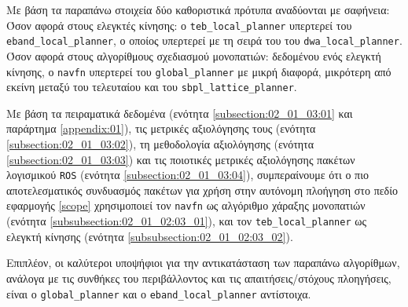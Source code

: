 Με βάση τα παραπάνω στοιχεία δύο καθοριστικά πρότυπα αναδύονται με σαφήνεια:
Όσον αφορά στους ελεγκτές κίνησης: ο \texttt{teb\_local\_planner} υπερτερεί του
\texttt{eband\_local\_planner}, ο οποίος υπερτερεί με τη σειρά του του
\texttt{dwa\_local\_planner}. Όσον αφορά στους αλγορίθμους σχεδιασμού
μονοπατιών: δεδομένου ενός ελεγκτή κίνησης, ο \texttt{navfn} υπερτερεί του
\texttt{global\_planner} με μικρή διαφορά, μικρότερη από εκείνη μεταξύ του
τελευταίου και του \texttt{sbpl\_lattice\_planner}.

\begin{bw_box}
Με βάση τα πειραματικά δεδομένα (ενότητα \ref{subsection:02_01_03:01} και
  παράρτημα \ref{appendix:01}), τις μετρικές αξιολόγησης τους (ενότητα
  \ref{subsection:02_01_03:02}), τη μεθοδολογία αξιολόγησης (ενότητα
  \ref{subsection:02_01_03:03}) και τις ποιοτικές μετρικές αξιολόγησης πακέτων
  λογισμικού \texttt{ROS} (ενότητα \ref{subsection:02_01_03:04}), συμπεραίνουμε
  ότι ο πιο αποτελεσματικός συνδυασμός πακέτων για χρήση στην αυτόνομη πλοήγηση
  στο πεδίο εφαρμογής \ref{scope} χρησιμοποιεί τον \texttt{navfn} ως αλγόριθμο
  χάραξης μονοπατιών (ενότητα \ref{subsubsection:02_01_02:03_01}), και τον
  \texttt{teb\_local\_planner} ως ελεγκτή κίνησης (ενότητα
  \ref{subsubsection:02_01_02:03_02}).
\end{bw_box}

Επιπλέον, οι καλύτεροι υποψήφιοι για την αντικατάσταση των παραπάνω
αλγορίθμων, ανάλογα με τις συνθήκες του περιβάλλοντος και τις
απαιτήσεις/στόχους πλοηγήσεις, είναι ο \texttt{global\_planner} και ο
\texttt{eband\_local\_planner} αντίστοιχα.
